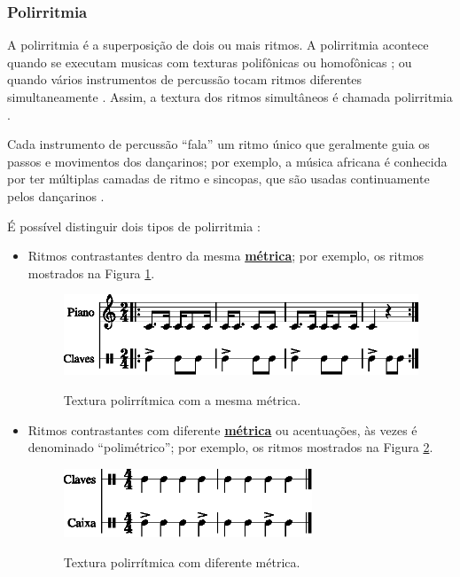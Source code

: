
\subsubsection{Polirritmia}
\label{subsec:polirritmia}
A polirritmia é a superposição de dois ou mais ritmos.
A polirritmia acontece quando se executam musicas com texturas polifônicas ou homofônicas
\cite[pp. 93]{alves2004teoria};
ou quando vários instrumentos de percussão tocam ritmos diferentes simultaneamente \cite[pp. 35]{holland2013music}.
Assim, a textura dos ritmos simultâneos é chamada polirritmia \cite[pp. 35]{holland2013music}.

Cada instrumento de percussão ``fala'' um ritmo único que geralmente guia os passos e movimentos dos dançarinos;
por exemplo, a música africana é conhecida por ter múltiplas camadas de ritmo e sincopas,
 que são usadas continuamente pelos dançarinos \cite[pp. 35]{holland2013music}.


É possível distinguir dois tipos de polirritmia \cite[pp. 687]{apel1969harvard}:
\begin{itemize}
\item Ritmos contrastantes dentro da mesma \hyperref[def:Metrica]{\textbf{métrica}};
por exemplo, os ritmos mostrados na Figura \ref{fig:polirritmia1-1}.
\begin{figure}[!h]
\centering
    \href{https://drive.google.com/file/d/1uBNMYazV83ynLyp1s6EtsPLb57Xpi9o6/view?usp=sharing}{\includegraphics[width=\textwidth]{chapters/cap-musicalidade-percepcion/polirritmia1-1.eps}}
  \caption{Textura polirrítmica com a mesma métrica.}
\label{fig:polirritmia1-1}
\end{figure}
\item Ritmos contrastantes com diferente \hyperref[def:Metrica]{\textbf{métrica}} ou acentuações, 
às vezes é denominado ``polimétrico'';
por exemplo, os ritmos mostrados na Figura \ref{fig:polirritmia2-1}.
\begin{figure}[!h]
\centering
    \href{https://drive.google.com/file/d/1C5Gq4U6rIs7Re2NcdUmVxdHt6qy0CCeX/view?usp=sharing}{\includegraphics[width=0.7\textwidth]{chapters/cap-musicalidade-percepcion/polirritmia2-1.eps}}
  \caption{Textura polirrítmica com diferente métrica.}
\label{fig:polirritmia2-1}
\end{figure}
\end{itemize}


